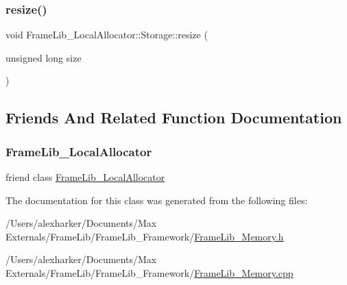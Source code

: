 \mbox{\label{class_frame_lib___local_allocator_1_1_storage_aa4c7c5b51de2b88770a5de6f273cfd26}} 
\subsubsection{\texorpdfstring{resize()}{resize()}}
{\footnotesize\ttfamily void Frame\+Lib\+\_\+\+Local\+Allocator\+::\+Storage\+::resize (\begin{DoxyParamCaption}\item[{unsigned long}]{size }\end{DoxyParamCaption})}



\subsection{Friends And Related Function Documentation}
\mbox{\label{class_frame_lib___local_allocator_1_1_storage_ab38ae86a5b2f6f2e79c8b7ed2a9c8c20}} 
\subsubsection{\texorpdfstring{Frame\+Lib\+\_\+\+Local\+Allocator}{FrameLib\_LocalAllocator}}
{\footnotesize\ttfamily friend class \hyperlink{class_frame_lib___local_allocator}{Frame\+Lib\+\_\+\+Local\+Allocator}\hspace{0.3cm}{\ttfamily [friend]}}



The documentation for this class was generated from the following files\+:\begin{DoxyCompactItemize}
\item 
/\+Users/alexharker/\+Documents/\+Max Externals/\+Frame\+Lib/\+Frame\+Lib\+\_\+\+Framework/\hyperlink{_frame_lib___memory_8h}{Frame\+Lib\+\_\+\+Memory.\+h}\item 
/\+Users/alexharker/\+Documents/\+Max Externals/\+Frame\+Lib/\+Frame\+Lib\+\_\+\+Framework/\hyperlink{_frame_lib___memory_8cpp}{Frame\+Lib\+\_\+\+Memory.\+cpp}\end{DoxyCompactItemize}
